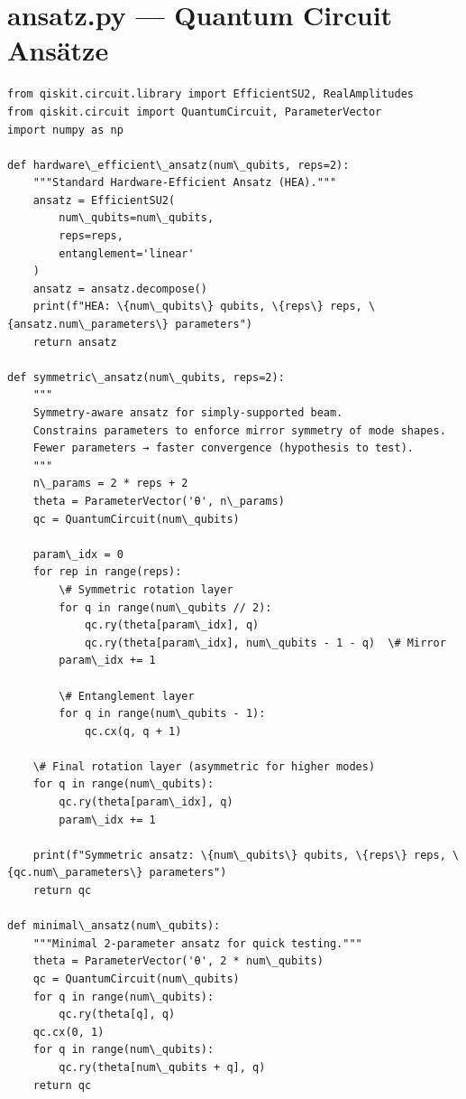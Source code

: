 \documentclass[12pt, a4paper]{article}
\begin{document}
\section{ansatz.py --- Quantum Circuit Ansätze}
\begin{lstlisting}[style=codestyle, caption={{ansatz.py --- Quantum Circuit Ansätze}}]
from qiskit.circuit.library import EfficientSU2, RealAmplitudes
from qiskit.circuit import QuantumCircuit, ParameterVector
import numpy as np

def hardware\_efficient\_ansatz(num\_qubits, reps=2):
    """Standard Hardware-Efficient Ansatz (HEA)."""
    ansatz = EfficientSU2(
        num\_qubits=num\_qubits,
        reps=reps,
        entanglement='linear'
    )
    ansatz = ansatz.decompose()
    print(f"HEA: \{num\_qubits\} qubits, \{reps\} reps, \{ansatz.num\_parameters\} parameters")
    return ansatz

def symmetric\_ansatz(num\_qubits, reps=2):
    """
    Symmetry-aware ansatz for simply-supported beam.
    Constrains parameters to enforce mirror symmetry of mode shapes.
    Fewer parameters → faster convergence (hypothesis to test).
    """
    n\_params = 2 * reps + 2
    theta = ParameterVector('θ', n\_params)
    qc = QuantumCircuit(num\_qubits)
    
    param\_idx = 0
    for rep in range(reps):
        \# Symmetric rotation layer
        for q in range(num\_qubits // 2):
            qc.ry(theta[param\_idx], q)
            qc.ry(theta[param\_idx], num\_qubits - 1 - q)  \# Mirror
        param\_idx += 1
        
        \# Entanglement layer
        for q in range(num\_qubits - 1):
            qc.cx(q, q + 1)
    
    \# Final rotation layer (asymmetric for higher modes)
    for q in range(num\_qubits):
        qc.ry(theta[param\_idx], q)
        param\_idx += 1
    
    print(f"Symmetric ansatz: \{num\_qubits\} qubits, \{reps\} reps, \{qc.num\_parameters\} parameters")
    return qc

def minimal\_ansatz(num\_qubits):
    """Minimal 2-parameter ansatz for quick testing."""
    theta = ParameterVector('θ', 2 * num\_qubits)
    qc = QuantumCircuit(num\_qubits)
    for q in range(num\_qubits):
        qc.ry(theta[q], q)
    qc.cx(0, 1)
    for q in range(num\_qubits):
        qc.ry(theta[num\_qubits + q], q)
    return qc
\end{lstlisting}
\end{document}
